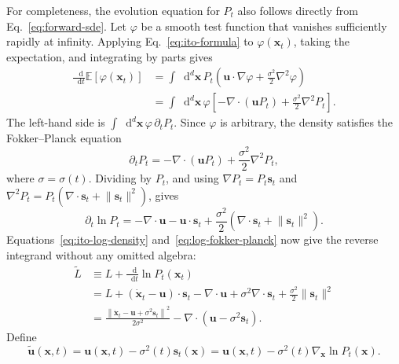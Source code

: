 \documentclass[11pt]{article}
\newcommand{\vct}[1]{\bm{#1}}
\newcommand{\dd}{\mathop{}\!\mathrm{d}}
\begin{document}
For completeness, the evolution equation for \(P_t\) also follows directly
from Eq.~\eqref{eq:forward-sde}. Let \(\varphi\) be a smooth test function that
vanishes sufficiently rapidly at infinity. Applying Eq.~\eqref{eq:ito-formula}
to \(\varphi(\vct{x}_t)\), taking the expectation, and integrating by parts gives
\begin{align}
    \frac{\dd}{\dd t}\mathbb{E}[\varphi(\vct{x}_t)]
    &=\int\dd^d\vct{x}\,P_t
      \left(\vct{u}\cdot\nabla\varphi
      +\frac{\sigma^2}{2}\nabla^2\varphi\right)
    \nonumber\\
    &=\int\dd^d\vct{x}\,\varphi
      \left[-\nabla\cdot(\vct{u}P_t)
      +\frac{\sigma^2}{2}\nabla^2P_t\right].
    \label{eq:test-function-evolution}
\end{align}
The left-hand side is \(\int\dd^d\vct{x}\,\varphi\,\partial_t P_t\).
Since \(\varphi\) is arbitrary, the density satisfies the Fokker--Planck equation
\begin{equation}
    \partial_t P_t
    =-\nabla\cdot(\vct{u}P_t)+\frac{\sigma^2}{2}\nabla^2P_t,
    \label{eq:fokker-planck}
\end{equation}
where \(\sigma=\sigma(t)\). Dividing by \(P_t\), and using
\(\nabla P_t=P_t\vct{s}_t\) and
\(\nabla^2P_t=P_t(\nabla\cdot\vct{s}_t+\lVert\vct{s}_t\rVert^2)\), gives
\begin{equation}
    \partial_t\ln P_t
    =-\nabla\cdot\vct{u}-\vct{u}\cdot\vct{s}_t
    +\frac{\sigma^2}{2}
    \left(\nabla\cdot\vct{s}_t+\lVert\vct{s}_t\rVert^2\right).
    \label{eq:log-fokker-planck}
\end{equation}
Equations~\eqref{eq:ito-log-density} and~\eqref{eq:log-fokker-planck} now give
the reverse integrand without any omitted algebra:
\begin{align}
    \widetilde{L}
    &\equiv L+\frac{\dd}{\dd t}\ln P_t(\vct{x}_t)
    \nonumber\\
    &=L+(\dot{\vct{x}}_t-\vct{u})\cdot\vct{s}_t
      -\nabla\cdot\vct{u}
      +\sigma^2\nabla\cdot\vct{s}_t
      +\frac{\sigma^2}{2}\lVert\vct{s}_t\rVert^2
    \nonumber\\
    &=\frac{\left\lVert
      \dot{\vct{x}}_t-\vct{u}+\sigma^2\vct{s}_t
      \right\rVert^2}{2\sigma^2}
      -\nabla\cdot(\vct{u}-\sigma^2\vct{s}_t).
    \label{eq:reverse-lagrangian-ito}
\end{align}
Define
\begin{equation}
    \widetilde{\vct{u}}(\vct{x},t)
    =\vct{u}(\vct{x},t)-\sigma^2(t)\vct{s}_t(\vct{x})
    =\vct{u}(\vct{x},t)-\sigma^2(t)\nabla_{\vct{x}}\ln P_t(\vct{x}).
    \label{eq:reverse-drift}
\end{equation}
\end{document}
